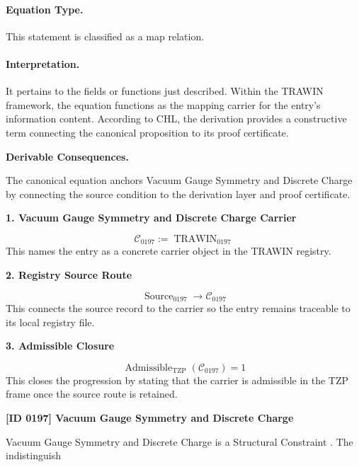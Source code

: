 \paragraph{Equation Type.}
This statement is classified as a map relation.

\paragraph{Interpretation.}
It pertains to the fields or functions just described. Within the TRAWIN framework, the equation functions as the mapping carrier for the entry’s information content. According to CHL, the derivation provides a constructive term connecting the canonical proposition to its proof certificate.

\par\vspace{0.35em}
\noindent\textbf{Derivable Consequences.}\quad
\begingroup
\footnotesize
\raggedright
The canonical equation anchors Vacuum Gauge Symmetry and Discrete Charge by connecting the source condition to the derivation layer and proof certificate.
\par\endgroup

\noindent\textbf{1. Vacuum Gauge Symmetry and Discrete Charge Carrier}\par
\[
\mathcal{C}_{0197} := \operatorname{TRAWIN}_{0197}
\]
\noindent This names the entry as a concrete carrier object in the TRAWIN registry.\par
\noindent\textbf{2. Registry Source Route}\par
\[
\operatorname{Source}_{0197}\longrightarrow \mathcal{C}_{0197}
\]
\noindent This connects the source record to the carrier so the entry remains traceable to its local registry file.\par
\noindent\textbf{3. Admissible Closure}\par
\[
\operatorname{Admissible}_{\mathrm{TZP}}\!\left(\mathcal{C}_{0197}\right)=1
\]
\noindent This closes the progression by stating that the carrier is admissible in the TZP frame once the source route is retained.\par

\clearpage
\noindent\textbf{[ID 0197] Vacuum Gauge Symmetry and Discrete Charge}\par
\vspace{0.35em}
\begingroup\small
{}
Vacuum Gauge Symmetry and Discrete Charge is a Structural Constraint  . The indistinguish

